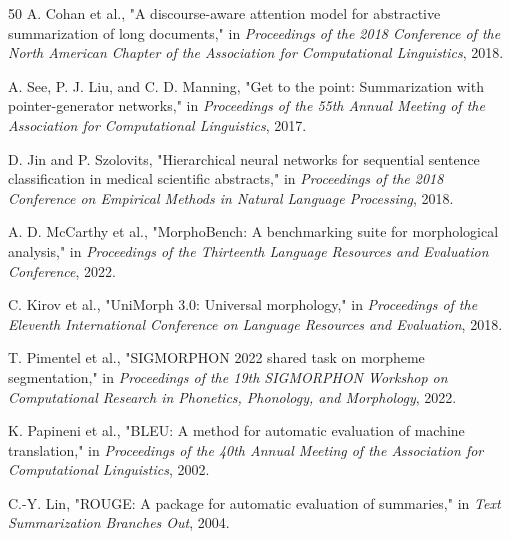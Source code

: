 \documentclass[conference]{IEEEtran}
\begin{document}
\begin{thebibliography}{50}
A. Cohan et al., "A discourse-aware attention model for abstractive summarization of long documents," in \textit{Proceedings of the 2018 Conference of the North American Chapter of the Association for Computational Linguistics}, 2018.

A. See, P. J. Liu, and C. D. Manning, "Get to the point: Summarization with pointer-generator networks," in \textit{Proceedings of the 55th Annual Meeting of the Association for Computational Linguistics}, 2017.

D. Jin and P. Szolovits, "Hierarchical neural networks for sequential sentence classification in medical scientific abstracts," in \textit{Proceedings of the 2018 Conference on Empirical Methods in Natural Language Processing}, 2018.

A. D. McCarthy et al., "MorphoBench: A benchmarking suite for morphological analysis," in \textit{Proceedings of the Thirteenth Language Resources and Evaluation Conference}, 2022.

C. Kirov et al., "UniMorph 3.0: Universal morphology," in \textit{Proceedings of the Eleventh International Conference on Language Resources and Evaluation}, 2018.

T. Pimentel et al., "SIGMORPHON 2022 shared task on morpheme segmentation," in \textit{Proceedings of the 19th SIGMORPHON Workshop on Computational Research in Phonetics, Phonology, and Morphology}, 2022.

K. Papineni et al., "BLEU: A method for automatic evaluation of machine translation," in \textit{Proceedings of the 40th Annual Meeting of the Association for Computational Linguistics}, 2002.

C.-Y. Lin, "ROUGE: A package for automatic evaluation of summaries," in \textit{Text Summarization Branches Out}, 2004.

\end{thebibliography}
\end{document}
